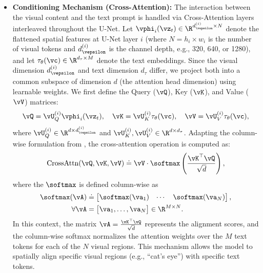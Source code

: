 \documentclass[../../book-main.tex]{subfiles}
\begin{document}
\begin{itemize}
    \item \textbf{Conditioning Mechanism (Cross-Attention):} The interaction between the visual content and the text prompt is handled via Cross-Attention layers interleaved throughout the U-Net.
Let \(\vphi_{i}(\vz_{t}) \in \R^{d_{\vepsilon}^{(i)} \times N}\) denote the flattened spatial features at U-Net layer \(i\) (where \(N = h_{i} \times w_{i}\) is the number of visual tokens and \(d_{\vepsilon}^{(i)}\) is the channel depth, e.g., 320, 640, or 1280), and let \(\tau_{\theta}(\vc) \in \R^{d_{\tau} \times M}\) denote the text embeddings.
Since the visual dimension \(d_{\vepsilon}^{(i)}\) and text dimension \(d_{\tau}\) differ, we project both into a common subspace of dimension \(d\) (the attention head dimension) using learnable weights.
We first define the Query (\(\vQ\)), Key (\(\vK\)), and Value (\(\vV\)) matrices:
    \begin{equation}
        \vQ = \vU^{(i)}_{Q} \vphi_{i}(\vz_{t}), \quad
        \vK = \vU^{(i)}_{K} \tau_{\theta}(\vc), \quad
        \vV = \vU^{(i)}_{V} \tau_{\theta}(\vc) ,
    \end{equation}
    where \(\vU^{(i)}_{Q} \in \R^{d \times d_{\vepsilon}^{(i)}}\) and \(\vU^{(i)}_{K}, \vU^{(i)}_{V} \in \R^{d \times d_{\tau}}\).
Adapting the column-wise formulation from , the cross-attention operation is computed as:
    \begin{equation}
        \text{CrossAttn}(\vQ, \vK, \vV) \doteq \vV \cdot \softmax\left( \frac{\vK^\top \vQ}{\sqrt{d}} \right) ,
    \end{equation}
    where the \(\softmax\) is defined column-wise as
    \begin{align}
        \softmax(\vA)
        &\doteq \begin{bmatrix} \softmax(\va_{1}) & \cdots & \softmax(\va_{N}) \end{bmatrix} , \\
        \forall \vA
        &= \begin{bmatrix} \va_{1}, \dots, \va_{N} \end{bmatrix} \in \R^{M \times N} .
    \end{align}
    In this context, the matrix \(\vA = \frac{\vK^\top \vQ}{\sqrt{d}}\) represents the alignment scores, and the column-wise softmax normalizes the attention weights over the \(M\) text tokens for each of the \(N\) visual regions.
This mechanism allows the model to spatially align specific visual regions (e.g., ``cat's eye'') with specific text tokens.
\end{itemize}
\end{document}
